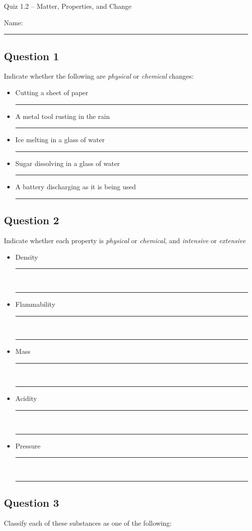 \documentclass[11pt, letterpaper]{memoir}
\begin{document}
\begin{center}
	{\large	Quiz 1.2 -- Matter, Properties, and Change}
\end{center}
{\large Name: \rule[-1mm]{4in}{.1pt}
\subsection*{Question 1}
Indicate whether the following are \emph{physical} or \emph{chemical} changes:
\begin{itemize}
	\item Cutting a sheet of paper \rule[-2pt]{8em}{1pt}
	\item A metal tool rusting in the rain \rule[-2pt]{8em}{1pt}
	\item Ice melting in a glass of water \rule[-2pt]{8em}{1pt}
	\item Sugar dissolving in a glass of water \rule[-2pt]{8em}{1pt}
	\item A battery discharging as it is being used \rule[-2pt]{8em}{1pt}
\end{itemize}

\subsection*{Question 2}
Indicate whether each property is \emph{physical} or \emph{chemical}, and \emph{intensive} or \emph{extensive}
\begin{itemize}
  \item Density \rule[-2pt]{8em}{1pt} ~\hspace{2em} \rule[-2pt]{8em}{1pt}
  \item Flammability \rule[-2pt]{8em}{1pt} ~\hspace{2em} \rule[-2pt]{8em}{1pt}
  \item Mass \rule[-2pt]{8em}{1pt} ~\hspace{2em} \rule[-2pt]{8em}{1pt}
  \item Acidity \rule[-2pt]{8em}{1pt} ~\hspace{2em} \rule[-2pt]{8em}{1pt}
  \item Pressure \rule[-2pt]{8em}{1pt} ~\hspace{2em} \rule[-2pt]{8em}{1pt}
\end{itemize}

\subsection*{Question 3}
Classify each of these substances as one of the following:

}
\end{document}
